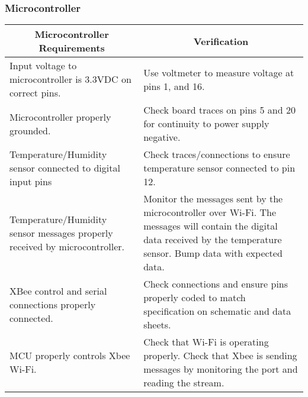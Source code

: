\subsubsection{Microcontroller}
\begin{tabular}{|p{\mytabwidth}|p{\mytabwidth}|}
\hline
\multicolumn{1}{|c|}{Microcontroller Requirements} & \multicolumn{1}{|c|}{Verification} \\
\hline\hline
Input voltage to microcontroller is 3.3VDC on correct pins.  & Use voltmeter to measure voltage at pins 1, and 16. \\
\hline
Microcontroller properly grounded. & Check board traces on pins 5 and 20 for continuity to power supply negative. \\
\hline
Temperature/Humidity sensor connected to digital input pins & Check traces/connections to ensure temperature sensor connected to pin 12. \\
\hline
Temperature/Humidity sensor messages properly received by microcontroller. & Monitor the messages sent by the microcontroller over Wi-Fi.  The messages will contain the digital data received by the temperature sensor. Bump data with expected data.\\
\hline
XBee control and serial connections properly connected. & Check connections and ensure pins properly coded to match specification on schematic and data sheets.\\
\hline
MCU properly controls Xbee Wi-Fi. & Check that Wi-Fi is operating properly. Check that Xbee is sending messages by monitoring the port and reading the stream.\\
\hline
\end{tabular}

